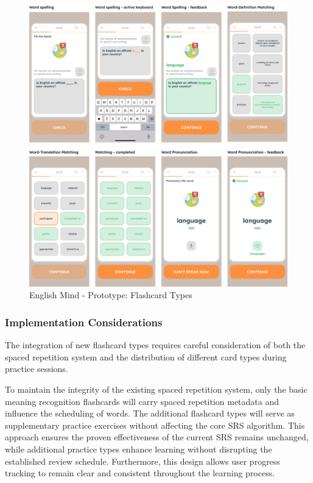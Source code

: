 \begin{figure}[!h]
    \includegraphics[width=1\textwidth]{src/figures/em-prototype-flashcards.png}
    \caption{English Mind - Prototype: Flashcard Types}
    \label{fig:em-prototype-flashcard-types}
\end{figure}

\subsubsection{Implementation Considerations}

The integration of new flashcard types requires careful consideration of both the spaced repetition system and the distribution of different card types during practice sessions.

To maintain the integrity of the existing spaced repetition system, only the basic meaning recognition flashcards will carry spaced repetition metadata and influence the scheduling of words. The additional flashcard types will serve as supplementary practice exercises without affecting the core SRS algorithm. This approach ensures the proven effectiveness of the current SRS remains unchanged, while additional practice types enhance learning without disrupting the established review schedule. Furthermore, this design allows user progress tracking to remain clear and consistent throughout the learning process.

